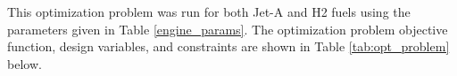 \documentclass[conf]{new-aiaa}
\begin{document}
This optimization problem was run for both Jet-A and H2 fuels using the parameters given in Table \ref{engine_params}.
The optimization problem objective function, design variables, and constraints are shown in Table \ref{tab:opt_problem} below.

\end{document}
